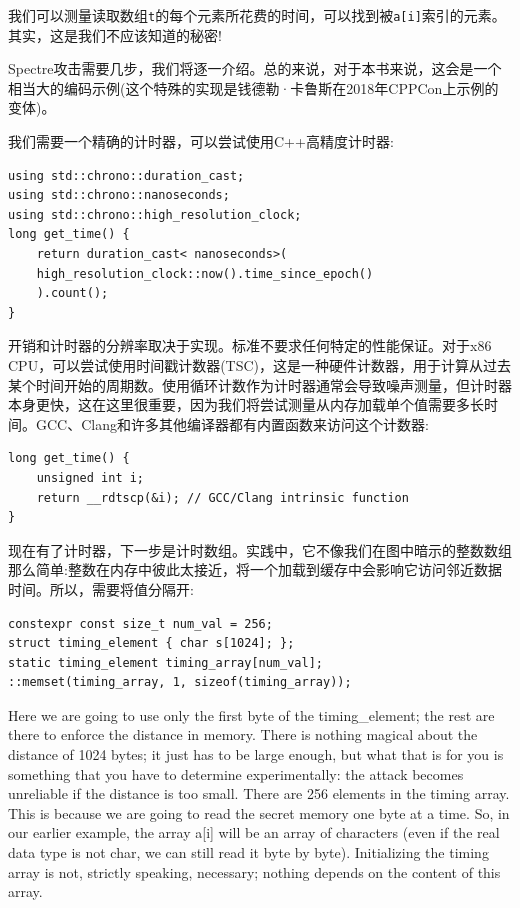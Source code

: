 我们可以测量读取数组\texttt{t}的每个元素所花费的时间，可以找到被\texttt{a[i]}索引的元素。其实，这是我们不应该知道的秘密!


Spectre攻击需要几步，我们将逐一介绍。总的来说，对于本书来说，这会是一个相当大的编码示例(这个特殊的实现是钱德勒·卡鲁斯在2018年CPPCon上示例的变体)。

我们需要一个精确的计时器，可以尝试使用C++高精度计时器:

\begin{lstlisting}[style=styleCXX]
using std::chrono::duration_cast;
using std::chrono::nanoseconds;
using std::chrono::high_resolution_clock;
long get_time() {
	return duration_cast< nanoseconds>(
	high_resolution_clock::now().time_since_epoch()
	).count();
}
\end{lstlisting}

开销和计时器的分辨率取决于实现。标准不要求任何特定的性能保证。对于x86 CPU，可以尝试使用时间戳计数器(TSC)，这是一种硬件计数器，用于计算从过去某个时间开始的周期数。使用循环计数作为计时器通常会导致噪声测量，但计时器本身更快，这在这里很重要，因为我们将尝试测量从内存加载单个值需要多长时间。GCC、Clang和许多其他编译器都有内置函数来访问这个计数器:

\begin{lstlisting}[style=styleCXX]
long get_time() {
	unsigned int i;
	return __rdtscp(&i); // GCC/Clang intrinsic function
}
\end{lstlisting}

现在有了计时器，下一步是计时数组。实践中，它不像我们在图中暗示的整数数组那么简单:整数在内存中彼此太接近，将一个加载到缓存中会影响它访问邻近数据时间。所以，需要将值分隔开:

\begin{lstlisting}[style=styleCXX]
constexpr const size_t num_val = 256;
struct timing_element { char s[1024]; };
static timing_element timing_array[num_val];
::memset(timing_array, 1, sizeof(timing_array));
\end{lstlisting}

Here we are going to use only the first byte of the timing\_element; the rest are there to enforce the distance in memory. There is nothing magical about the distance of 1024 bytes; it just has to be large enough, but what that is for you is something that you have to determine experimentally: the attack becomes unreliable if the distance is too small. There are 256 elements in the timing array. This is because we are going to read the secret memory one byte at a time. So, in our earlier example, the array a[i] will be an array of characters (even if the real data type is not char, we can still read it byte by byte). Initializing the timing array is not, strictly speaking, necessary; nothing depends on the content of this array.

